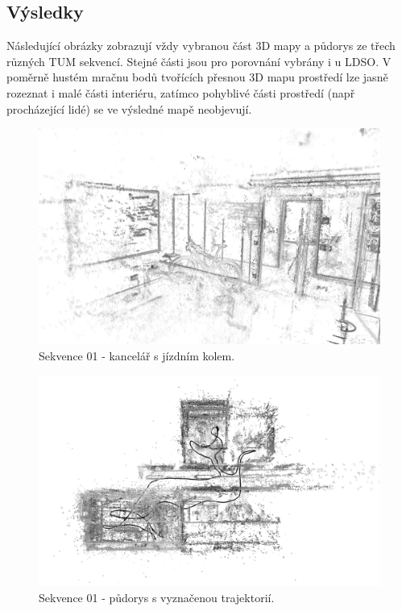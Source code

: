 \documentclass[12pt,a4paper]{report}
\begin{document}
\subsection*{Výsledky}
Následující obrázky zobrazují vždy vybranou část 3D mapy a půdorys ze třech různých TUM sekvencí. Stejné části jsou pro porovnání vybrány i u LDSO. V poměrně hustém mračnu bodů tvořících přesnou 3D mapu prostředí lze jasně rozeznat i malé části interiéru, zatímco pohyblivé části prostředí (např procházející lidé) se ve výsledné mapě neobjevují.

\begin{figure}[H]
\centering
\includegraphics[width=1.0\textwidth]{img/DSO_01_kolo.png}
\caption{Sekvence 01 - kancelář s jízdním kolem.}
\end{figure} 

\begin{figure}[H]
\centering
\includegraphics[width=1.0\textwidth]{img/DSO_01_top_b.png}
\caption{Sekvence 01 - půdorys s vyznačenou trajektorií.}
\end{figure} 
\end{document}

